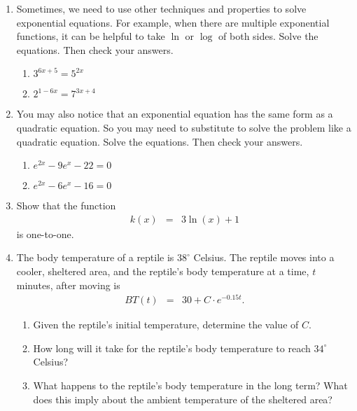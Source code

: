 \begin{enumerate}
\clearpage

\item Sometimes, we need to use other techniques and properties to
  solve exponential equations.  For example, when there are multiple
  exponential functions, it can be helpful to take $\ln$ or $\log$ of
  both sides.  Solve the equations.  Then check your answers.
\begin{enumerate}
\item $3^{6x+5}=5^{2x}$
\vfill

\item $2^{1-6x}=7^{3x+4}$
\vfill

\end{enumerate}
\clearpage

\item You may also notice that an exponential equation has the same
  form as a quadratic equation.  So you may need to substitute to
  solve the problem like a quadratic equation.  Solve the equations.
  Then check your answers.
\begin{enumerate}
\item $e^{2x}-9e^x-22=0$\vfill
\item $e^{2x}-6e^x-16=0$\vfill
\end{enumerate}

\item Show that the function
  \begin{eqnarray*}
    k(x) & = & 3 \ln(x) + 1
  \end{eqnarray*}
  is one-to-one.
  \vfill

  \clearpage

\item The body temperature of a reptile is $38^\circ$ Celsius. The
  reptile moves into a cooler, sheltered area, and the reptile's body
  temperature at a time, $t$ minutes, after moving is
  \begin{eqnarray*}
    BT(t) & = & 30+C\cdot e^{-0.15t}.
  \end{eqnarray*}

  \begin{enumerate}
  \item Given the reptile's initial temperature, determine the value
    of $C$.
    \vfill
  \item How long will it take for the reptile's body temperature to
    reach $34^\circ$ Celsius?
    \vfill
  \item What happens to the reptile's body temperature in the long
    term? What does this imply about the ambient temperature of the
    sheltered area?
    \vfill
  \end{enumerate}


\end{enumerate}


